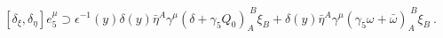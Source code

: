 \begin{equation} \label{comutator}
[\delta_\xi,\delta_\eta]e^\mu_5\supset\epsilon^{-1}(y)\delta(y)\bar{\eta}^A\gamma^\mu\left(\delta+\gamma_5Q_{0}\right)_A^{\;B}\xi_B+\delta(y)\bar{\eta}^A\gamma^\mu\left(\gamma_{5}\omega+\bar{\omega}\right)_A^{\;B}\xi_B\ .
\end{equation} 
